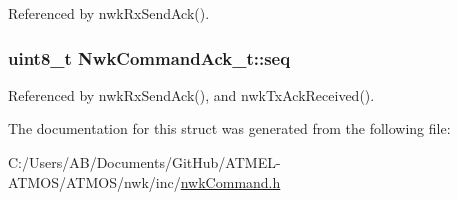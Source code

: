 Referenced by nwk\-Rx\-Send\-Ack().

\hypertarget{struct_nwk_command_ack__t_a0accb86a272cf69bb4358b18977bf373}{
\subsubsection[{seq}]{\setlength{\rightskip}{0pt plus 5cm}uint8\-\_\-t Nwk\-Command\-Ack\-\_\-t\-::seq}}\label{struct_nwk_command_ack__t_a0accb86a272cf69bb4358b18977bf373}


Referenced by nwk\-Rx\-Send\-Ack(), and nwk\-Tx\-Ack\-Received().



The documentation for this struct was generated from the following file\-:\begin{DoxyCompactItemize}
\item 
C\-:/\-Users/\-A\-B/\-Documents/\-Git\-Hub/\-A\-T\-M\-E\-L-\/\-A\-T\-M\-O\-S/\-A\-T\-M\-O\-S/nwk/inc/\hyperlink{nwk_command_8h}{nwk\-Command.\-h}\end{DoxyCompactItemize}
